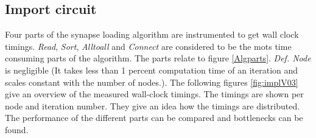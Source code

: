 \subsection{Import circuit}
Four parts of the synapse loading algorithm are instrumented to get wall clock timings.
\emph{Read}, \emph{Sort}, \emph{Alltoall} and \emph{Connect} are considered to be the mots time
consuming parts of the algorithm. The parts relate to figure \ref{Algparts}.
\emph{Def. Node} is negligible (It takes less than 1 percent computation time of an iteration and scales constant with the number of nodes.).
The following figures \ref{fig:implV03} give an overview of the measured wall-clock timings.
The timings are shown per node and iteration number. They give an idea how the timings are distributed.
The performance of the different parts can be compared and bottlenecks can be found.
